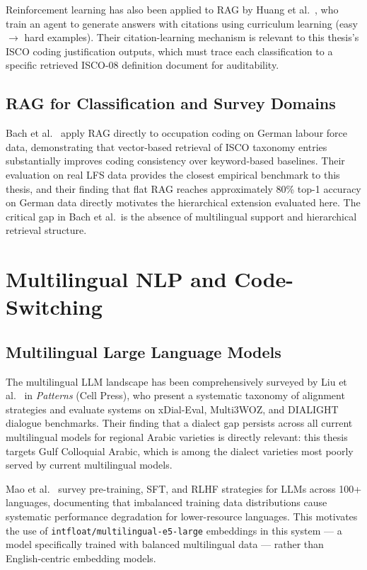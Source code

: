 Reinforcement learning has also been applied to RAG by Huang et
al.~\cite{huang2025ragrl}, who train an agent to generate answers with citations
using curriculum learning (easy $\to$ hard examples).
Their citation-learning mechanism is relevant to this thesis's ISCO coding
justification outputs, which must trace each classification to a specific
retrieved ISCO-08 definition document for auditability.

\subsection{RAG for Classification and Survey Domains}

Bach et al.~\cite{bach2025rag} apply RAG directly to occupation coding on
German labour force data, demonstrating that vector-based retrieval of ISCO
taxonomy entries substantially improves coding consistency over keyword-based
baselines.
Their evaluation on real LFS data provides the closest empirical benchmark to
this thesis, and their finding that flat RAG reaches approximately 80\% top-1
accuracy on German data directly motivates the hierarchical extension evaluated
here.
The critical gap in Bach et al.\ is the absence of multilingual support and
hierarchical retrieval structure.

\section{Multilingual NLP and Code-Switching}
\label{sec:rw-multilingual}

\subsection{Multilingual Large Language Models}

The multilingual LLM landscape has been comprehensively surveyed by Liu et
al.~\cite{liu2025mllmsurvey} in \textit{Patterns} (Cell Press), who present
a systematic taxonomy of alignment strategies and evaluate systems on xDial-Eval,
Multi3WOZ, and DIALIGHT dialogue benchmarks.
Their finding that a dialect gap persists across all current multilingual models
for regional Arabic varieties is directly relevant: this thesis targets Gulf
Colloquial Arabic, which is among the dialect varieties most poorly served by
current multilingual models.

Mao et al.~\cite{mao2025multilingual} survey pre-training, SFT, and RLHF
strategies for LLMs across 100+ languages, documenting that imbalanced training
data distributions cause systematic performance degradation for lower-resource
languages.
This motivates the use of \texttt{intfloat/multilingual-e5-large} embeddings
in this system --- a model specifically trained with balanced multilingual data
--- rather than English-centric embedding models.

